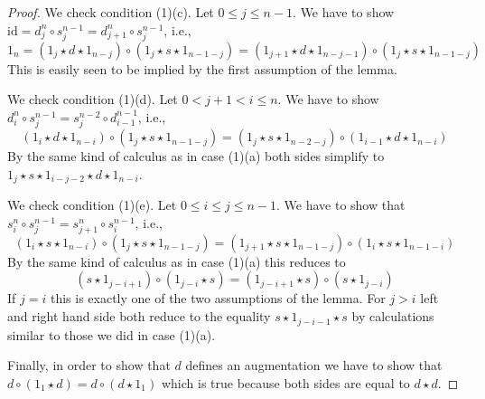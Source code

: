 \documentclass{stacks-project}
\theoremstyle{plain}
\theoremstyle{definition}
\theoremstyle{remark}
\numberwithin{equation}{subsection}
\begin{document}
\begin{proof}
\medskip\noindent
We check condition (1)(c). Let $0 \leq j \leq n - 1$. We have to show
$\text{id} = d^n_j \circ s^{n - 1}_j = d^n_{j + 1} \circ s^{n - 1}_j$, i.e.,
$$
1_n =
(1_j \star d \star 1_{n - j}) \circ
(1_j \star s \star 1_{n - 1 - j}) =
(1_{j + 1} \star d \star 1_{n - j - 1}) \circ
(1_j \star s \star 1_{n - 1 - j})
$$
This is easily seen to be implied by the first assumption of the lemma.

\medskip\noindent
We check condition (1)(d). Let $0 < j + 1 < i \leq n$. We have to show
$d^n_i \circ s^{n - 1}_j = s^{n - 2}_j \circ d^{n - 1}_{i - 1}$, i.e.,
$$
(1_i \star d \star 1_{n - i}) \circ
(1_j \star s \star 1_{n - 1 - j}) =
(1_j \star s \star 1_{n - 2 - j}) \circ
(1_{i - 1} \star d \star 1_{n - i})
$$
By the same kind of calculus as in case (1)(a) both sides simplify
to $1_j \star s \star 1_{i - j - 2} \star d \star 1_{n - i}$.

\medskip\noindent
We check condition (1)(e). Let $0 \leq i \leq j \leq n - 1$. We
have to show that
$s^n_i \circ s^{n - 1}_j = s^n_{j + 1} \circ s^{n - 1}_i$, i.e.,
$$
(1_i \star s \star 1_{n - i}) \circ
(1_j \star s \star 1_{n - 1 - j}) =
(1_{j + 1} \star s \star 1_{n - 1 - j}) \circ
(1_i \star s \star 1_{n - 1 - i})
$$
By the same kind of calculus as in case (1)(a) this reduces to
$$
(s \star 1_{j - i + 1}) \circ (1_{j - i} \star s) =
(1_{j - i + 1} \star s) \circ (s \star 1_{j - i})
$$
If $j = i$ this is exactly one of the two assumptions of the lemma.
For $j > i$ left and
right hand side both reduce to the equality $s \star 1_{j - i - 1} \star s$
by calculations similar to those we did in case (1)(a).

\medskip\noindent
Finally, in order to show that $d$ defines an augmentation we have
to show that $d \circ (1_1 \star d) = d \circ (d \star 1_1)$ which is
true because both sides are equal to $d \star d$.
\end{proof}
\end{document}
